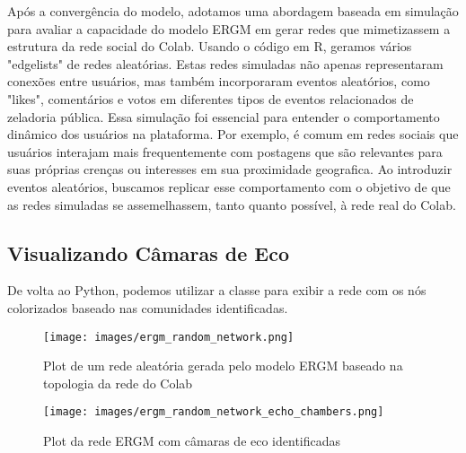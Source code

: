 Após a convergência do modelo, adotamos uma abordagem baseada em simulação para avaliar a capacidade do modelo ERGM em gerar redes que mimetizassem a estrutura da rede social do Colab. Usando o código em R, geramos vários "edgelists" de redes aleatórias. Estas redes simuladas não apenas representaram conexões entre usuários, mas também incorporaram eventos aleatórios, como "likes", comentários e votos em diferentes tipos de eventos relacionados de zeladoria pública. Essa simulação foi essencial para entender o comportamento dinâmico dos usuários na plataforma. Por exemplo, é comum em redes sociais que usuários interajam mais frequentemente com postagens que são relevantes para suas próprias crenças ou interesses em sua proximidade geografica. Ao introduzir eventos aleatórios, buscamos replicar esse comportamento com o objetivo de que as redes simuladas se assemelhassem, tanto quanto possível, à rede real do Colab.

\subsection{Visualizando Câmaras de Eco}

De volta ao Python, podemos utilizar a classe  para exibir a rede com os nós colorizados baseado nas comunidades identificadas. 

\begin{figure}[!htb]
	\caption{Plot de um rede aleatória gerada pelo modelo ERGM baseado na topologia da rede do Colab}
	\label{fig:ergm_random_network}
	\centering
	\texttt{[image: images/ergm\_random\_network.png]}
	\fautor
\end{figure}

\begin{figure}[!htb]
	\caption{Plot da rede ERGM com câmaras de eco identificadas}
	\label{fig:ergm_random_network_echo_chambers}
	\centering
	\texttt{[image: images/ergm\_random\_network\_echo\_chambers.png]}
	\fautor
\end{figure}
